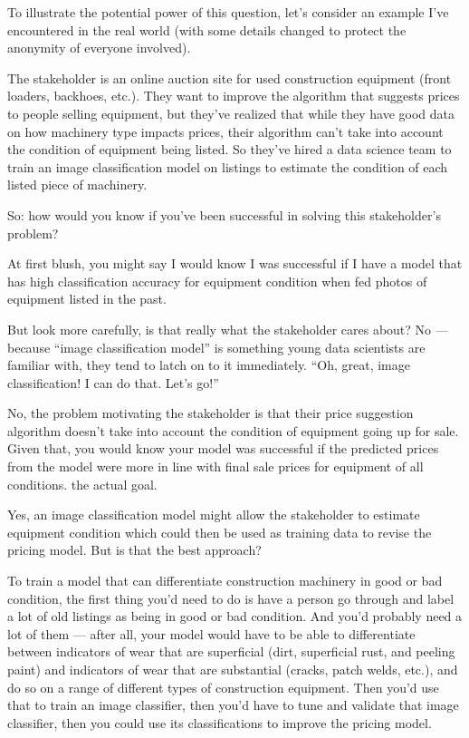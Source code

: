 \documentclass[letterpaper,10pt,english]{jupyterBook}
\begin{document}
\sphinxAtStartPar
To illustrate the potential power of this question, let’s consider an example I’ve encountered in the real world (with some details changed to protect the anonymity of everyone involved).

\sphinxAtStartPar
The stakeholder is an online auction site for used construction equipment (front loaders, backhoes, etc.). They want to improve the algorithm that suggests prices to people selling equipment, but they’ve realized that while they have good data on how machinery type impacts prices, their algorithm can’t take into account the condition of equipment being listed. So they’ve hired a data science team to train an image classification model on listings to estimate the condition of each listed piece of machinery.

\sphinxAtStartPar
So: how would you know if you’ve been successful in solving this stakeholder’s problem?

\sphinxAtStartPar
At first blush, you might say I would know I was successful if I have a model that has high classification accuracy for equipment condition when fed photos of equipment listed in the past.

\sphinxAtStartPar
But look more carefully, is that really what the stakeholder cares about? No — because “image classification model” is something young data scientists are familiar with, they tend to latch on to it immediately. “Oh, great, image classification! I can do that. Let’s go!”

\sphinxAtStartPar
No, the problem motivating the stakeholder is that their price suggestion algorithm doesn’t take into account the condition of equipment going up for sale. Given that, you would know your model was successful if the predicted prices from the model were more in line with final sale prices for equipment of all conditions.  the actual goal.

\sphinxAtStartPar
Yes, an image classification model might allow the stakeholder to estimate equipment condition which could then be used as training data to revise the pricing model. But is that the best approach?

\sphinxAtStartPar
To train a model that can differentiate construction machinery in good or bad condition, the first thing you’d need to do is have a person go through and label a lot of old listings as being in good or bad condition. And you’d probably need a lot of them — after all, your model would have to be able to differentiate between indicators of wear that are superficial (dirt, superficial rust, and peeling paint) and indicators of wear that are substantial (cracks, patch welds, etc.), and do so on a range of different types of construction equipment. Then you’d use that to train an image classifier, then you’d have to tune and validate that image classifier, then you could use its classifications to improve the pricing model.
\end{document}
